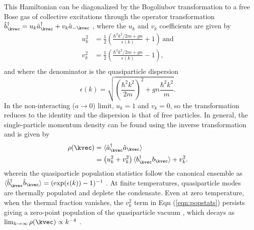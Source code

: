     This Hamiltonian can be diagonalized by the Bogoliubov transformation to a free Bose gas of collective excitations through the operator transformation $\hat{b}_{\kvec}^\dagger = u_k \hat{a}_\kvec^\dagger + v_k \hat{a}_{-\kvec}$ \cite{Bogolubov47,PethickSmith}, where the $u_k$ and $v_k$ coefficients are given by
	\begin{align}
		u_{k}^2 &= \frac{1}{2}\left(\frac{\hbar^2k^2/2m + gn}{\epsilon(k)} + 1\right)~\textrm{and}\\
		v_{k}^2 &= \frac{1}{2}\left(\frac{\hbar^2k^2/2m + gn}{\epsilon(k)} - 1\right),\\
	\end{align}
	and where the denominator is the quasiparticle dispersion
	\begin{equation}
		\epsilon(k) = \sqrt{\left(\frac{\hbar^2k^2}{2m}\right)^2 + gn\frac{ \hbar^2k^2}{m}}.
	\end{equation}
	In the non-interacting ($a\rightarrow0$) limit, $u_k=1$ and $v_k=0$, so the transformation reduces to the identity and the dispersion is that of free particles. 
	In general, the single-particle momentum density can be found using the inverse transformation and is given by
	 \begin{align}
	 \rho(\kvec) &= \langle\hat{a}_\kvec^\dagger\hat{a}_\kvec\rangle\\
		 &=\left(u_{k}^{2}+v_{k}^{2}\right)\langle b_{\kvec}^{\dagger}b_{\kvec}\rangle + v_{k}^{2}.
		 \label{eqn:popstats}
	 \end{align}
	wherein the quasiparticle population statistics follow the canonical ensemble as $\langle \hat{b}^\dagger_\kvec\hat{b}_\kvec\rangle = (\exp(\epsilon(k))-1)^{-1}$ \cite{PitaevskiiStringari,Chang16}. At finite temperatures, quasiparticle modes are thermally populated and deplete the condensate.  Even at zero temperature, when the thermal fraction vanishes, the $v_k^2$ term in Eqn (\ref{eqn:popstats}) persists giving a zero-point population of the quasiparticle vacuum \cite{Decamp18,Chang16}, which decays as $\lim_{k\rightarrow\infty}\rho(\kvec)\propto k^{-4}$ \cite{PethickSmith,PitaevskiiStringari,Chang16}.

